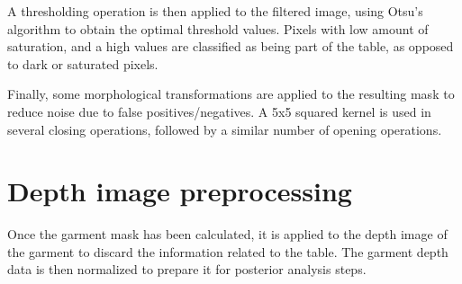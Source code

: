 A thresholding operation is then applied to the filtered image, using Otsu's algorithm  to obtain the optimal threshold values. Pixels with low amount of saturation, and a high values are classified as being part of the table, as opposed to dark or saturated pixels.

Finally, some morphological transformations are applied to the resulting mask to reduce noise due to false positives/negatives. A 5x5 squared kernel is used in several closing operations, followed by a similar number of opening operations.


\section{Depth image preprocessing}
\label{depth_image_preprocessing}

Once the garment mask has been calculated, it is applied to the depth image of the garment to discard the information related to the table. The garment depth data is then normalized to prepare it for posterior analysis steps.